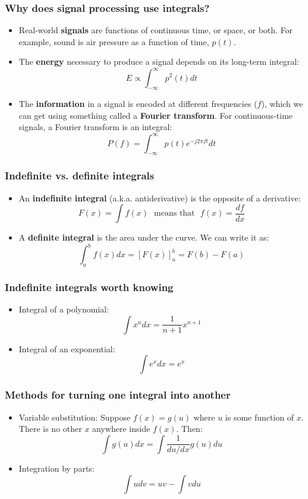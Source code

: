 \documentclass{beamer}
\begin{document}
\begin{frame}
  \frametitle{Why does signal processing use integrals?}
  \begin{itemize}
  \item Real-world {\bf signals} are functions of continuous time, or space,
    or both.  For example, sound is air pressure as a function of
    time, $p(t)$.
  \item The {\bf energy} necessary to produce a signal depends on its
    long-term integral:
    \[
    E \propto \int_{-\infty}^\infty p^2(t)dt
    \]
  \item The {\bf information} in a signal is encoded at different
    frequencies ($f$), which we can get using something called a {\bf
      Fourier transform}.  For continuous-time signals, a Fourier
    transform is an integral:
    \[
    P(f) = \int_{-\infty}^\infty p(t)e^{-j2\pi f t}dt
    \]
  \end{itemize}
\end{frame}
    
\begin{frame}
  \frametitle{Indefinite vs. definite integrals}
  \begin{itemize}
  \item An {\bf indefinite integral} (a.k.a. antiderivative) is the opposite
    of a derivative:
    \[
    F(x) = \int f(x) ~~~\mbox{means that}~~~ f(x) = \frac{df}{dx}
    \]
  \item A {\bf definite integral} is the area under the curve.  We can write it as:
    \[
    \int_a^b f(x)dx = \left[F(x)\right]_a^b = F(b)-F(a)
    \]
  \end{itemize}
\end{frame}

\begin{frame}
  \frametitle{Indefinite integrals worth knowing}
  \begin{itemize}
  \item Integral of a polynomial:
    \[
    \int x^n dx = \frac{1}{n+1} x^{n+1}
    \]
  \item Integral of an exponential:
    \[
    \int e^{x} dx = e^{x}
    \]
  \end{itemize}
\end{frame}

\begin{frame}
  \frametitle{Methods for turning one integral into another}
  \begin{itemize}
  \item Variable substitution: Suppose $f(x)=g(u)$ where $u$ is some
    function of $x$.  There is no other $x$ anywhere inside $f(x)$.  Then:
    \[
    \int g(u)dx = \int \frac{1}{du/dx}g(u)du
    \]
  \item
    Integration by parts:
    \[
    \int u dv = uv - \int v du
    \]
  \end{itemize}
\end{frame}
\end{document}
